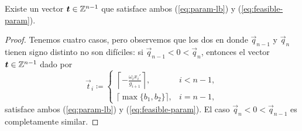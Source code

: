 \begin{lemma}
	\label{lemma:t-existence}
	Existe un vector $\boldsymbol{t} \in \mathbb{Z}^{n-1}$ que satisface ambos (\ref{eq:param-lb}) y
	(\ref{eq:feasible-param}).
\end{lemma}
\begin{proof}
	Tenemos cuatro casos, pero observemos que los dos en donde $\vec{q}_{n - 1}$ y $\vec{q}_n$
	tienen signo distinto no son difíciles: si $\vec{q}_{n - 1} <0 < \vec{q}_n$, entonces el vector
	$\boldsymbol{t} \in \mathbb{Z}^{n-1}$ dado por
	\begin{equation*}
		\vec{t}_i \coloneq \begin{cases}
			\left\lceil -\frac{\omega_i x_i'}{g_{i + 1}} \right\rceil, & i < n - 1, \\
			\lceil \max\lbrace b_1, b_2 \rbrace \rceil, & i = n - 1,
		\end{cases}
	\end{equation*}
	satisface ambos (\ref{eq:param-lb}) y (\ref{eq:feasible-param}). El caso $\vec{q}_n < 0 <
	\vec{q}_{n - 1}$ es completamente similar.


\end{proof}
